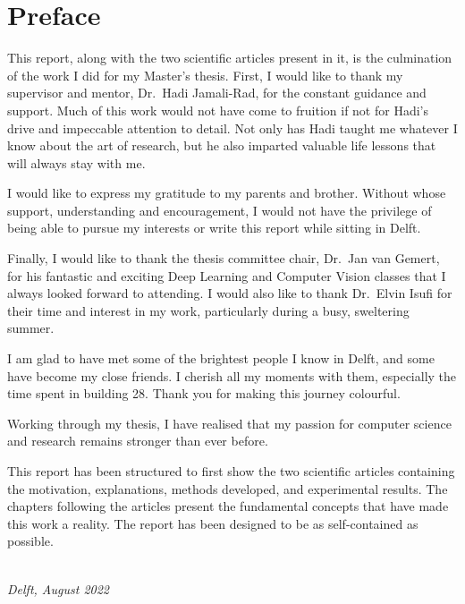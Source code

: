 \chapter*{Preface}

This report, along with the two scientific articles present in it, is the culmination of the work I did for my Master's thesis. First, I would like to thank my supervisor and mentor, Dr.~Hadi Jamali-Rad, for the constant guidance and support. Much of this work would not have come to fruition if not for Hadi's drive and impeccable attention to detail. Not only has Hadi taught me whatever I know about the art of research, but he also imparted valuable life lessons that will always stay with me.

I would like to express my gratitude to my parents and brother. Without whose support, understanding and encouragement, I would not have the privilege of being able to pursue my interests or write this report while sitting in Delft.

Finally, I would like to thank the thesis committee chair, Dr.~Jan van Gemert, for his fantastic and exciting Deep Learning and Computer Vision classes that I always looked forward to attending. I would also like to thank Dr.~Elvin Isufi for their time and interest in my work, particularly during a busy, sweltering summer.

I am glad to have met some of the brightest people I know in Delft, and some have become my close friends. I cherish all my moments with them, especially the time spent in building 28. Thank you for making this journey colourful.

Working through my thesis, I have realised that my passion for computer science and research remains stronger than ever before.

This report has been structured to first show the two scientific articles containing the motivation, explanations, methods developed, and experimental results. The chapters following the articles present the fundamental concepts that have made this work a reality. The report has been designed to be as self-contained as possible.

\begin{flushright}
{\makeatletter\itshape
    \@author \\
    Delft, August 2022
\makeatother}
\end{flushright}